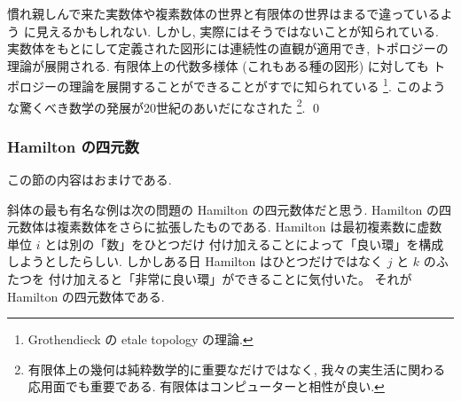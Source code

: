 \documentclass[12pt,twoside]{jarticle}
\begin{document}
\begin{guide}[有限体上の幾何]
  慣れ親しんで来た実数体や複素数体の世界と有限体の世界はまるで違っているよう
  に見えるかもしれない.  しかし, 実際にはそうではないことが知られている.
  実数体をもとにして定義された図形には連続性の直観が適用でき, 
  トポロジーの理論が展開される. 
  有限体上の代数多様体 (これもある種の図形) に対しても
  トポロジーの理論を展開することができることがすでに知られている%
  \footnote{Grothendieck の etale topology の理論.}.
  このような驚くべき数学の発展が20世紀のあいだになされた%
  \footnote{有限体上の幾何は純粋数学的に重要なだけではなく,
    我々の実生活に関わる応用面でも重要である.
    有限体はコンピューターと相性が良い.}.
  \qed
\end{guide}


\subsubsection{Hamilton の四元数}

この節の内容はおまけである.

斜体の最も有名な例は次の問題の Hamilton の四元数体だと思う.
Hamilton の四元数体は複素数体をさらに拡張したものである.
Hamilton は最初複素数に虚数単位 $i$ とは別の「数」をひとつだけ
付け加えることによって「良い環」を構成しようとしたらしい.
しかしある日 Hamilton はひとつだけではなく $j$ と $k$ のふたつを
付け加えると「非常に良い環」ができることに気付いた。
それが Hamilton の四元数体である.
\end{document}
